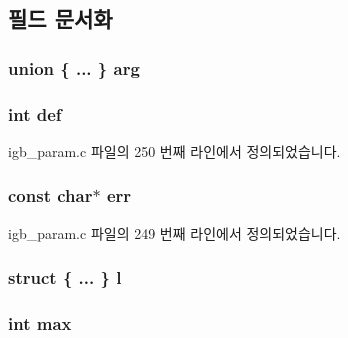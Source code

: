 \subsection{필드 문서화}
\subsubsection[{\texorpdfstring{arg}{arg}}]{\setlength{\rightskip}{0pt plus 5cm}union \{ ... \}   arg}\hypertarget{structigb__option_a54a6c6fc46350c3bf91d43042c432672}{}\label{structigb__option_a54a6c6fc46350c3bf91d43042c432672}
\subsubsection[{\texorpdfstring{def}{def}}]{\setlength{\rightskip}{0pt plus 5cm}int def}\hypertarget{structigb__option_a1d879277a80820e8232bceb4458507dc}{}\label{structigb__option_a1d879277a80820e8232bceb4458507dc}


igb\+\_\+param.\+c 파일의 250 번째 라인에서 정의되었습니다.

\subsubsection[{\texorpdfstring{err}{err}}]{\setlength{\rightskip}{0pt plus 5cm}const char$\ast$ err}\hypertarget{structigb__option_a2b204df2d3a2278921d9c7a4fc6a4d5b}{}\label{structigb__option_a2b204df2d3a2278921d9c7a4fc6a4d5b}


igb\+\_\+param.\+c 파일의 249 번째 라인에서 정의되었습니다.

\subsubsection[{\texorpdfstring{l}{l}}]{\setlength{\rightskip}{0pt plus 5cm}struct \{ ... \}   l}\hypertarget{structigb__option_a0a5dc97c2612260c60ca5cd724e47f2d}{}\label{structigb__option_a0a5dc97c2612260c60ca5cd724e47f2d}
\subsubsection[{\texorpdfstring{max}{max}}]{\setlength{\rightskip}{0pt plus 5cm}int max}\hypertarget{structigb__option_ae1e1dde676c120fa6d10f3bb2c14059e}{}\label{structigb__option_ae1e1dde676c120fa6d10f3bb2c14059e}


